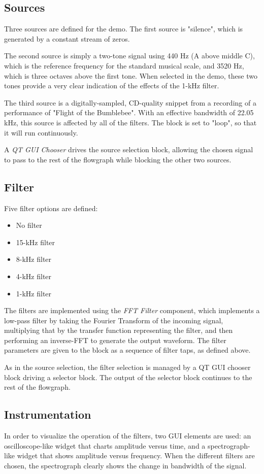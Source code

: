 \subsection{Sources}

Three sources are defined for the demo. The first source is
"silence", which is generated by a constant stream of zeros. 

The second source is simply a two-tone signal using 440 Hz (A
above middle C), which is the reference frequency for the
standard musical scale, and 3520 Hz, which is three octaves above
the first tone. When selected in the demo, these two tones
provide a very clear indication of the effects of the 1-kHz
filter.

The third source is a digitally-sampled, CD-quality
snippet from a recording of a performance of "Flight of the
Bumblebee". With an effective bandwidth of 22.05 kHz, this source
is affected by all of the filters. The block is set to
"loop", so that it will run continuously.

A \textit{QT GUI Chooser} drives the source selection block,
allowing the chosen signal to pass to the rest of the flowgraph
while blocking the other two sources.

\subsection{Filter}
Five filter options are defined: 
\begin{itemize}
	\item No filter
	\item 15-kHz filter
	\item 8-kHz filter
	\item 4-kHz filter
	\item 1-kHz filter
\end{itemize}

The filters are implemented using the \textit{FFT Filter} component, which
implements a low-pass filter by taking the Fourier Transform of the
incoming signal, multiplying that by the transfer function
representing the filter, and then performing an inverse-FFT to
generate the output waveform.  The filter parameters are given to 
the block as a sequence of filter taps, as defined above.

As in the source selection, the filter selection is managed by a
QT GUI chooser block driving a selector block.  The output of the 
selector block continues to the rest of the flowgraph.

\subsection{Instrumentation}
In order to visualize the operation of the filters, two GUI elements
are used: an oscilloscope-like widget that charts amplitude versus time,
and a spectrograph-like widget that shows amplitude versus frequency.
When the different filters are chosen, the spectrograph clearly shows
the change in bandwidth of the signal.

